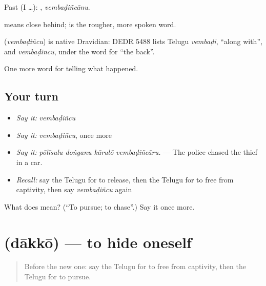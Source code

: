 Past (I …): , \emph{vembaḍiñcānu}.

 means close behind;  is the rougher, more spoken word.

\begin{cousinweb}
\textbf{} (\emph{vembaḍiñcu}) is native Dravidian: DEDR 5488 lists Telugu \emph{vembaḍi}, \textquotedblleft{}along with\textquotedblright{}, and \emph{vembaḍincu}, under the word for \textquotedblleft{}the back\textquotedblright{}.
\end{cousinweb}

\begin{grammarlens}[title={What you've built}]
One more word for telling what happened.
\end{grammarlens}

\subsection*{Your turn}
\begin{itemize}
\raggedright
  \item \emph{Say it:} \emph{vembaḍiñcu}
  \item \emph{Say it:} \emph{vembaḍiñcu}, once more
  \item \emph{Say it:} \emph{pōlīsulu doṅganu kārulō vembaḍiñcāru.} — The police chased the thief in a car.
  \item \emph{Recall:} say the Telugu for to release, then the Telugu for to free from captivity, then say \emph{vembaḍiñcu} again
\end{itemize}

\begin{tcolorbox}[breakable,colback=teal!4,colframe=teal!35!black,title={Before you move on}]
What does  mean? (\textquotedblleft{}To pursue; to chase\textquotedblright{}.) Say it once more.
\end{tcolorbox}
\section[\texorpdfstring{\te{దాక్కో} (dākkō)}{దాక్కో (dākkō)}]{ (dākkō) — to hide oneself}

\label{lesson:TE-C352-dakko}



\begin{quote}
Before the new one: say the Telugu for to free from captivity, then the Telugu for to pursue.
\end{quote}

